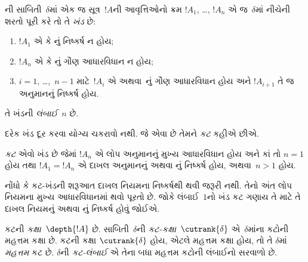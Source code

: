 \begin{defn}
ની સાબિતી~$\delta$માં
એક જ સૂત્ર~$!A$ની
આવૃત્તિઓનો ક્રમ
$!A_1$, \dots, $!A_n$
એ જ~$\delta$માં
નીચેની શરતો પૂરી
કરે તો તે
\emph{ખંડ} છે:
\begin{enumerate}
  \item $!A_1$ એ
  \Elim{\lor} કે
  \Elim{\lexists}નું
  નિષ્કર્ષ ન હોય;
  \item $!A_n$ એ
  \Elim{\lor} કે
  \Elim{\lexists}નું
  ગૌણ આધારવિધાન
  ન હોય;
  \item $i = 1$,
  \dots,~$n-1$
  માટે~$!A_i$ એ
  \Elim{\lor}
  અથવા~\Elim{\lexists}નું
  ગૌણ આધારવિધાન
  હોય અને
  $!A_{i+1}$
  તે જ અનુમાનનું
  નિષ્કર્ષ હોય.
\end{enumerate}
તે ખંડની
\emph{લંબાઈ}~$n$ છે.
\end{defn}

દરેક ખંડ દૂર
કરવા યોગ્ય
ચકરાવો નથી.
જે એવા છે
તેમને \emph{કટ}
કહીએ છીએ.

\begin{defn}
\emph{કટ} એવો
ખંડ છે જેમાં
$!A_n$ એ
લોપ
અનુમાનનું મુખ્ય
આધારવિધાન હોય
અને કાં તો
$n=1$ હોય તથા
$!A_1 = !A_n$
એ દાખલ
અનુમાનનું અથવા
\FalseInt{}નું
નિષ્કર્ષ હોય,
અથવા~$n>1$
હોય.
\end{defn}

નોંધો કે કટ-ખંડની
શરૂઆત દાખલ
નિયમના નિષ્કર્ષથી
થવી જરૂરી નથી.
તેનો અંત
લોપ
નિયમના મુખ્ય
આધારવિધાનમાં
થવો પૂરતો છે.
જોકે લંબાઈ~$1$નો
ખંડ કટ ગણાય
તે માટે તે
દાખલ
નિયમનું અથવા
\FalseInt{}નું
નિષ્કર્ષ હોવું
જોઈએ.

\begin{defn}
કટની \emph{કક્ષા}~$\depth{!A}$
છે. સાબિતી~$\delta$ની
\emph{કટ-કક્ષા}~$\cutrank{\delta}$
એ~$\delta$માંના
કટોની મહત્તમ
કક્ષા છે.
કટની કક્ષા
$\cutrank{\delta}$
હોય, એટલે
મહત્તમ કક્ષા
હોય, તો તે
$\delta$માં
\emph{મહત્તમ}
કટ છે.
$\delta$ની
\emph{કટ-લંબાઈ}
એ તેના બધા
મહત્તમ કટોની
લંબાઈનો સરવાળો
છે.
\end{defn}
\endgroup

\begingroup
\makeatletter{}\makeatother


\label{guunit:OLP-0675}



